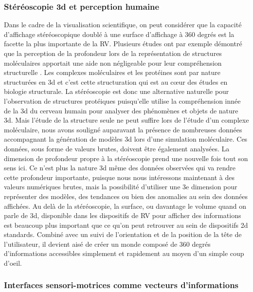 \subsubsection{Stéréoscopie 3d et perception humaine}

Dans le cadre de la visualisation scientifique, on peut considérer que la capacité d'affichage stéréoscopique doublé à une surface d'affichage à 360 degrés est la facette la plus importante de la RV. Plusieurs études ont par exemple démontré que la perception de la profondeur lors de la représentation de structures moléculaires apportait une aide non négligeable pour leur compréhension structurelle \cite{van_dam_immersive_2000,stone_immersive_2010,odonoghue_visualization_2010}. Les complexes moléculaires et les protéines sont par nature structurées en 3d et c'est cette structuration qui est au cœur des études en biologie structurale. La stéréoscopie est donc une alternative naturelle pour l'observation de structures protéiques puisqu'elle utilise la compréhension innée de la 3d du cerveau humain pour analyser des phénomènes et objets de nature 3d. 
Mais l'étude de la structure seule ne peut suffire lors de l'étude d'un complexe moléculaire, nous avons souligné auparavant la présence de nombreuses données accompagnant la génération de modèles 3d lors d'une simulation moléculaire. Ces données, sous forme de valeurs brutes, doivent être également analysées. La dimension de profondeur propre à la stéréoscopie prend une nouvelle fois tout son sens ici. Ce n'est plus la nature 3d même des données observées qui va rendre cette profondeur importante, puisque nous nous intéressons maintenant à des valeurs numériques brutes, mais la possibilité d'utiliser une 3e dimension pour représenter des modèles, des tendances ou bien des anomalies au sein des données affichées.
Au delà de la stéréoscopie, la surface, ou davantage le volume quand on parle de 3d, disponible dans les dispositifs de RV pour afficher des informations est beaucoup plus important que ce qu'on peut retrouver au sein de dispositifs 2d standards. Combiné avec un suivi de l'orientation et de la position de la tête de l'utilisateur, il devient aisé de créer un monde composé de 360 degrés d'informations accessibles simplement et rapidement au moyen d'un simple coup d'oeil.

\subsubsection{Interfaces sensori-motrices comme vecteurs d'informations}

